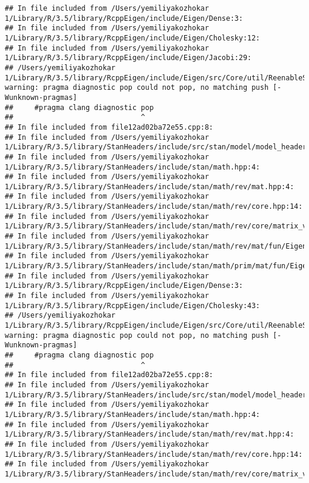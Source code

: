 \documentclass[]{article}
\begin{document}
\begin{verbatim}
## In file included from /Users/yemiliyakozhokar 1/Library/R/3.5/library/RcppEigen/include/Eigen/Dense:3:
## In file included from /Users/yemiliyakozhokar 1/Library/R/3.5/library/RcppEigen/include/Eigen/Cholesky:12:
## In file included from /Users/yemiliyakozhokar 1/Library/R/3.5/library/RcppEigen/include/Eigen/Jacobi:29:
## /Users/yemiliyakozhokar 1/Library/R/3.5/library/RcppEigen/include/Eigen/src/Core/util/ReenableStupidWarnings.h:10:30: warning: pragma diagnostic pop could not pop, no matching push [-Wunknown-pragmas]
##     #pragma clang diagnostic pop
##                              ^
## In file included from file12ad02ba72e55.cpp:8:
## In file included from /Users/yemiliyakozhokar 1/Library/R/3.5/library/StanHeaders/include/src/stan/model/model_header.hpp:4:
## In file included from /Users/yemiliyakozhokar 1/Library/R/3.5/library/StanHeaders/include/stan/math.hpp:4:
## In file included from /Users/yemiliyakozhokar 1/Library/R/3.5/library/StanHeaders/include/stan/math/rev/mat.hpp:4:
## In file included from /Users/yemiliyakozhokar 1/Library/R/3.5/library/StanHeaders/include/stan/math/rev/core.hpp:14:
## In file included from /Users/yemiliyakozhokar 1/Library/R/3.5/library/StanHeaders/include/stan/math/rev/core/matrix_vari.hpp:4:
## In file included from /Users/yemiliyakozhokar 1/Library/R/3.5/library/StanHeaders/include/stan/math/rev/mat/fun/Eigen_NumTraits.hpp:4:
## In file included from /Users/yemiliyakozhokar 1/Library/R/3.5/library/StanHeaders/include/stan/math/prim/mat/fun/Eigen.hpp:4:
## In file included from /Users/yemiliyakozhokar 1/Library/R/3.5/library/RcppEigen/include/Eigen/Dense:3:
## In file included from /Users/yemiliyakozhokar 1/Library/R/3.5/library/RcppEigen/include/Eigen/Cholesky:43:
## /Users/yemiliyakozhokar 1/Library/R/3.5/library/RcppEigen/include/Eigen/src/Core/util/ReenableStupidWarnings.h:10:30: warning: pragma diagnostic pop could not pop, no matching push [-Wunknown-pragmas]
##     #pragma clang diagnostic pop
##                              ^
## In file included from file12ad02ba72e55.cpp:8:
## In file included from /Users/yemiliyakozhokar 1/Library/R/3.5/library/StanHeaders/include/src/stan/model/model_header.hpp:4:
## In file included from /Users/yemiliyakozhokar 1/Library/R/3.5/library/StanHeaders/include/stan/math.hpp:4:
## In file included from /Users/yemiliyakozhokar 1/Library/R/3.5/library/StanHeaders/include/stan/math/rev/mat.hpp:4:
## In file included from /Users/yemiliyakozhokar 1/Library/R/3.5/library/StanHeaders/include/stan/math/rev/core.hpp:14:
## In file included from /Users/yemiliyakozhokar 1/Library/R/3.5/library/StanHeaders/include/stan/math/rev/core/matrix_vari.hpp:4:

\end{verbatim}
\end{document}
